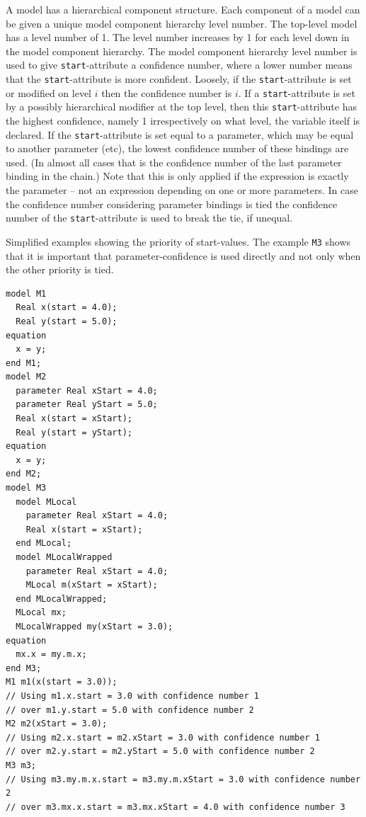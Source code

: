 \begin{nonnormative}
A model has a hierarchical component structure.
Each component of a model can be given a unique model component hierarchy level number.
The top-level model has a level number of 1.
The level number increases by 1 for each level down in the model component hierarchy.
The model component hierarchy level number is used to give \lstinline!start!-attribute a confidence number, where a lower number means that the \lstinline!start!-attribute is more confident.
Loosely, if the \lstinline!start!-attribute is set or modified on level $i$ then the confidence number is $i$.
If a \lstinline!start!-attribute is set by a possibly hierarchical modifier at the top level, then this \lstinline!start!-attribute has the highest confidence, namely 1 irrespectively on what level, the variable itself is declared.
If the \lstinline!start!-attribute is set equal to a parameter, which may be equal to another parameter (etc), the lowest confidence number of these bindings are used.
(In almost all cases that is the confidence number of the last parameter binding in the chain.)
Note that this is only applied if the expression is exactly the parameter -- not an expression depending on one or more parameters.
In case the confidence number considering parameter bindings is tied the confidence number of the \lstinline!start!-attribute is used to break the tie, if unequal.
\begin{example}
Simplified examples showing the priority of start-values.
The example \lstinline!M3! shows that it is important that parameter-confidence is used directly and not only when the other priority is tied.
\begin{lstlisting}[language=modelica]
model M1
  Real x(start = 4.0);
  Real y(start = 5.0);
equation
  x = y;
end M1;
model M2
  parameter Real xStart = 4.0;
  parameter Real yStart = 5.0;
  Real x(start = xStart);
  Real y(start = yStart);
equation
  x = y;
end M2;
model M3
  model MLocal
    parameter Real xStart = 4.0;
    Real x(start = xStart);
  end MLocal;
  model MLocalWrapped
    parameter Real xStart = 4.0;
    MLocal m(xStart = xStart);
  end MLocalWrapped;
  MLocal mx;
  MLocalWrapped my(xStart = 3.0);
equation
  mx.x = my.m.x;
end M3;
M1 m1(x(start = 3.0));
// Using m1.x.start = 3.0 with confidence number 1
// over m1.y.start = 5.0 with confidence number 2
M2 m2(xStart = 3.0);
// Using m2.x.start = m2.xStart = 3.0 with confidence number 1
// over m2.y.start = m2.yStart = 5.0 with confidence number 2
M3 m3;
// Using m3.my.m.x.start = m3.my.m.xStart = 3.0 with confidence number 2
// over m3.mx.x.start = m3.mx.xStart = 4.0 with confidence number 3
\end{lstlisting}
\end{example}
\end{nonnormative}
